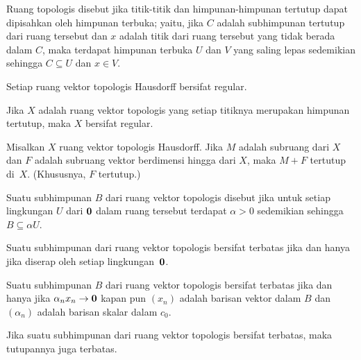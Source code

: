 \begin{defn} Ruang topologis disebut
 jika titik-titik dan himpunan-himpunan tertutup dapat dipisahkan oleh himpunan terbuka; yaitu, jika $C$ adalah subhimpunan tertutup dari ruang tersebut dan $x$ adalah titik
dari ruang tersebut yang tidak berada dalam $C$, maka terdapat himpunan terbuka $U$ dan $V$ yang saling lepas sedemikian sehingga $C \subseteq U$ dan $x \in V$.
\end{defn}

\begin{prop} Setiap ruang vektor topologis Hausdorff bersifat regular.
\end{prop}

\begin{cor} Jika $X$ adalah ruang vektor topologis yang setiap titiknya merupakan himpunan tertutup, maka $X$ bersifat regular.
\end{cor}

\begin{prop} Misalkan $X$ ruang vektor topologis Hausdorff.  Jika $M$ adalah subruang dari $X$ dan $F$ adalah subruang vektor berdimensi hingga
dari $X$, maka $M + F$ tertutup di~$X$. (Khususnya, $F$ tertutup.)
\end{prop}

\begin{defn} Suatu subhimpunan $B$ dari ruang vektor topologis disebut
 jika untuk setiap lingkungan $U$ dari $\mathbf{0}$ dalam ruang tersebut terdapat $\alpha > 0$ sedemikian sehingga $B \subseteq \alpha U$.
\end{defn}

\begin{prop} Suatu subhimpunan dari ruang vektor topologis bersifat terbatas jika dan hanya jika diserap oleh setiap lingkungan~$\mathbf{0}$.
\end{prop}

\begin{prop} Suatu subhimpunan $B$ dari ruang vektor topologis bersifat terbatas jika dan hanya jika $\alpha_n x_n \rightarrow \mathbf{0}$ kapan pun $(x_n)$ adalah
barisan vektor dalam $B$ dan $(\alpha_n)$ adalah barisan skalar dalam $c_0$.
\end{prop}

\begin{prop} Jika suatu subhimpunan dari ruang vektor topologis bersifat terbatas, maka tutupannya juga terbatas.
\end{prop}

